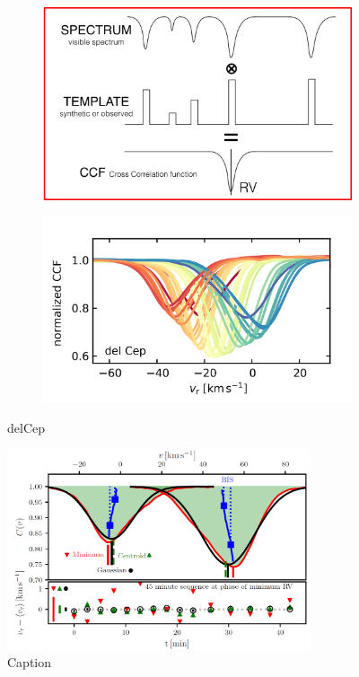         \begin{figure}[H]
        \centering
        \begin{subfigure}{.45\textwidth}
            \centering
            \includegraphics[width=\textwidth]{report/images/chap2_foundations/ccf_template.png}
        \end{subfigure}%
        \hspace{1em}
        \begin{subfigure}{.45\textwidth}
            \centering
            \includegraphics[width=\textwidth]{report/images/chap2_foundations/delCep_ccf.png}
        \end{subfigure}
        \caption{\ac{delCep}}
        \label{2.2b}
        \end{figure}

        \begin{figure}[H]
        \centering
        \includegraphics[width=0.8\textwidth]{report/images/chap2_foundations/anderson_2018.png}
        \caption{Caption}
        \label{2bonus}
        \end{figure}

